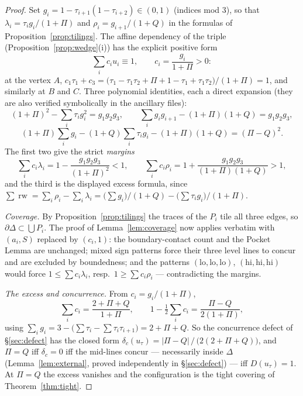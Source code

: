 \documentclass[11pt,reqno]{amsart}
\theoremstyle{plain}
\theoremstyle{definition}
\theoremstyle{remark}
\newcommand{\rw}{\operatorname{rw}}
\begin{document}
\begin{proof}
Set $g_i=1-\tau_{i+1}(1-\tau_{i+2})\in(0,1)$ (indices mod $3$), so that
$\lambda_i=\tau_ig_i/(1+\Pi)$ and $\rho_i=g_{i+1}/(1+Q)$ in the formulas of
Proposition~\ref{prop:tilings}. The affine dependency of the triple
(Proposition~\ref{prop:wedge}(i)) has the explicit positive form
\[
\sum_ic_iu_i\equiv1,\qquad c_i=\frac{g_i}{1+\Pi}>0 :
\]
at the vertex $A$, $c_1\tau_1+c_3
=\bigl(\tau_1-\tau_1\tau_2+\Pi+1-\tau_1+\tau_1\tau_2\bigr)/(1+\Pi)=1$, and
similarly at $B$ and $C$. Three polynomial identities, each a direct
expansion (they are also verified symbolically in the ancillary files):
\[
(1+\Pi)^2-\sum_i\tau_ig_i^2=g_1g_2g_3,\qquad
\sum_ig_ig_{i+1}-(1+\Pi)(1+Q)=g_1g_2g_3,
\]
\[
(1+\Pi)\sum_ig_i-(1+Q)\sum_i\tau_ig_i-(1+\Pi)(1+Q)=(\Pi-Q)^2 .
\]
The first two give the strict \emph{margins}
\[
\sum_ic_i\lambda_i=1-\frac{g_1g_2g_3}{(1+\Pi)^2}<1,\qquad
\sum_ic_i\rho_i=1+\frac{g_1g_2g_3}{(1+\Pi)(1+Q)}>1,
\]
and the third is the displayed excess formula, since
$\sum\rw=\sum_i\rho_i-\sum_i\lambda_i
=\bigl(\sum g_i\bigr)/(1+Q)-\bigl(\sum\tau_ig_i\bigr)/(1+\Pi)$.

\emph{Coverage.} By Proposition~\ref{prop:tilings} the traces of the $P_i$
tile all three edges, so $\partial\Delta\subset\bigcup P_i$. The proof of
Lemma~\ref{lem:coverage} now applies verbatim with $(a_i,S)$ replaced by
$(c_i,1)$: the boundary-contact count and the Pocket Lemma are unchanged;
mixed sign patterns force their three level lines to concur and are excluded
by boundedness; and the patterns
$(\mathrm{lo},\mathrm{lo},\mathrm{lo})$, $(\mathrm{hi},\mathrm{hi},\mathrm{hi})$
would force $1\le\sum c_i\lambda_i$, resp.\ $1\ge\sum c_i\rho_i$ ---
contradicting the margins.

\emph{The excess and concurrence.} From $c_i=g_i/(1+\Pi)$,
\[
\textstyle\sum_ic_i=\frac{2+\Pi+Q}{1+\Pi},\qquad
1-\tfrac12\sum_ic_i=\frac{\Pi-Q}{2(1+\Pi)},
\]
using $\sum_ig_i=3-\bigl(\sum\tau_i-\sum\tau_i\tau_{i+1}\bigr)=2+\Pi+Q$. So
the concurrence defect of \S\ref{sec:defect} has the closed form
$\delta_c(u_\tau)=|\Pi-Q|\,/\,\bigl(2(2+\Pi+Q)\bigr)$, and $\Pi=Q$ iff
$\delta_c=0$ iff the mid-lines concur --- necessarily inside $\Delta$
(Lemma~\ref{lem:external}, proved independently in \S\ref{sec:defect}) ---
iff $D(u_\tau)=1$. At $\Pi=Q$ the excess vanishes and the configuration is
the tight covering of Theorem~\ref{thm:tight}.
\end{proof}
\end{document}
